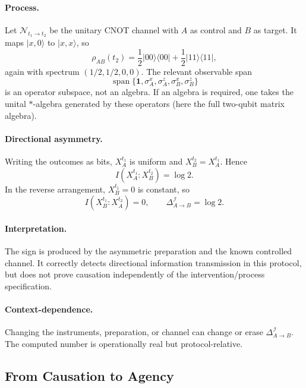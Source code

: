 \documentclass[11pt,a4paper]{article}
\begin{document}
\paragraph{Process.}
Let $\mathcal N_{t_1\to t_2}$ be the unitary CNOT channel with $A$ as control and $B$ as target.  It maps $|x,0\rangle$ to $|x,x\rangle$, so
\begin{equation}
\rho_{AB}(t_2)
=\frac12|00\rangle\langle00|
+\frac12|11\rangle\langle11|,
\end{equation}
again with spectrum $(1/2,1/2,0,0)$.  The relevant observable span
\[
\operatorname{span}\{\mathbf1,\sigma_A^x,\sigma_A^z,
\sigma_B^x,\sigma_B^z\}
\]
is an operator subspace, not an algebra.  If an algebra is required, one takes the unital $*$-algebra generated by these operators (here the full two-qubit matrix algebra).

\paragraph{Directional asymmetry.}
Writing the outcomes as bits, $X_A^{t_1}$ is uniform and $X_B^{t_2}=X_A^{t_1}$.  Hence
\begin{equation}
I(X_A^{t_1}:X_B^{t_2})=\log2.
\end{equation}
In the reverse arrangement, $X_B^{t_1}=0$ is constant, so
\begin{equation}
I(X_B^{t_1}:X_A^{t_2})=0,
\qquad
\Delta_{A\to B}^{\mathcal I}=\log2.
\end{equation}

\paragraph{Interpretation.}
The sign is produced by the asymmetric preparation and the known controlled channel.  It correctly detects directional information transmission in this protocol, but does not prove causation independently of the intervention/process specification.

\paragraph{Context-dependence.}
Changing the instruments, preparation, or channel can change or erase $\Delta_{A\to B}^{\mathcal I}$.  The computed number is operationally real but protocol-relative.

\subsection{From Causation to Agency}
\label{sec:I.6}
\end{document}

